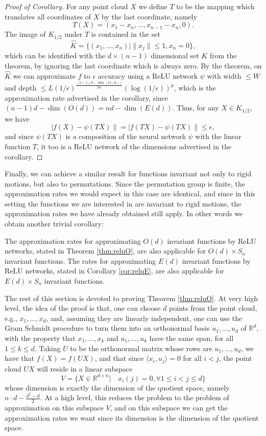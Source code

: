 \documentclass[twoside,11pt]{article}
\newcommand{\RR}{\mathbb{R}}
\begin{document}
\begin{proof}[Proof of Corollary]
For any point cloud $X$ we define $T$ to be the mapping which translates all coordinates of $X$ by the last coordinate, namely 
$$T(X)=(x_1-x_n,\ldots,x_{n-1}-x_n,0). $$
The image of $K_{1/2}$ under $T$ is contained in the set $$\hat K=\{(x_1,\ldots,x_n)| \|x_j\| \leq 1, x_n=0 \} , $$
which can be identified with the $d\times (n-1)$ dimensional set $K$ from the theorem, by ignoring the last coordinate which is always zero. By the theorem, on $\hat K $ we can approximate $f$ to $\epsilon$ accuracy using a ReLU network $\psi$ with width $\leq W$ and depth $\leq L(1/\epsilon)^{\frac{(n-1)d-\dim(O(d))}{2\alpha}}\left(\log(1/\epsilon)\right)^p$, which is the approximation rate advertised in the corollary, since $(n-1)d-\dim(O(d))=nd-\dim(E(d)) $. Thus, for any $X\in K_{1/2}$, we have 
$$|f(X)-\psi(TX)\|=|f(TX)-\psi(TX)\|\leq \epsilon ,$$
and since $\psi(TX)$ is a composition of the neural network $\psi$ with the linear function $T$, it too is a ReLU network of the dimensions advertised in the corollary.
\end{proof}

Finally, we can achieve a similar result for functions invariant not only  to rigid motions, but also  to permutations. Since the permutation group is finite, the approximation rates we would expect in this case are identical, and since in this setting the functions we are interested in are invariant to rigid motions, the approximation rates we have already obtained still apply. In other words we obtain another trivial corollary: 

\begin{cor}\label{cor:perm_also}
The approximation rates for approximating $O(d)$ invariant functions by ReLU networks, stated in  Theorem \ref{thm:reluO}, are also applicable for $O(d)\times S_n $ invariant functions. The rates for approximating $E(d)$ invariant functions by ReLU networks, stated in  Corollary \ref{cor:reluE}, are also applicable for $E(d)\times S_n $ invariant functions.
\end{cor}
The rest of this section is devoted to proving Theorem \ref{thm:reluO}. At very high level, the idea of the proof is that, one can choose $d$ points from the point cloud, e.g., $x_1,\ldots,x_d$, and, assuming they are linearly independent, one can use the Gram Schmidt procedure to turn them into an orthonormal basis $u_1,\ldots,u_d$ of $\RR^d$, with the property that $x_1,\ldots,x_k$ and $u_1,\ldots,u_k$ have the same span, for all $1\leq k \leq d$. Taking $U$ to be the orthonormal matrix whose rows are $u_1,\ldots,u_d$, we have that $f(X)=f(UX)$, and that since $\langle x_i,u_j \rangle=0 $ for all $i<j$, the point cloud $UX$ will reside in a linear subspace 
$$V=\{X\in \RR^{d\times n}| \quad x_{i}(j)=0, \forall 1\leq i<j \leq d \} $$
whose dimension is exactly the dimension of the quotient space, namely  $n\cdot d -\frac{d^2-d}{2} $. At a high level, this reduces the problem to the problem of approximation on this subspace $V$, and on this subspace we can get the approximation rates we want since its dimension is the dimension of the quotient space. 
\end{document}
